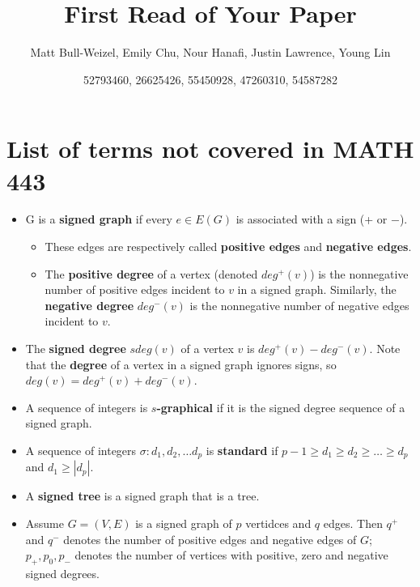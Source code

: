 \documentclass{article}
\title{First Read of Your Paper}
\author{Matt Bull-Weizel, Emily Chu, Nour Hanafi, Justin Lawrence, Young Lin}
\date{52793460, 26625426, 55450928, 47260310, 54587282}
\begin{document}
\maketitle

\section{List of terms not covered in MATH 443}
\begin{itemize}
\item G is a \textbf{signed graph} if every \(e \in E(G)\) is associated with a sign (+ or \(-\)). 
    \begin{itemize} 
        \item These edges are respectively called \textbf{positive edges} and \textbf{negative edges}.
        \item The \textbf{positive degree} of a vertex (denoted \(deg^+(v)\)) is the nonnegative number of positive edges incident to \(v\) in a signed graph. Similarly, the \textbf{negative degree} \(deg^-(v)\) is the nonnegative number of negative edges incident to \(v\).
    \end{itemize}
\item The \textbf{signed degree} \(sdeg(v)\) of a vertex \(v\) is \(deg^+(v) - deg^-(v)\). Note that the \textbf{degree} of a vertex in a signed graph ignores signs, so \(deg(v) = deg^+(v) + deg^-(v)\).
\item A sequence of integers is \textbf{\(s\)-graphical} if it is the signed degree sequence of a signed graph.
\item A sequence of integers \(\sigma: d_1, d_2, \dots d_p\) is \textbf{standard} if  \(p-1 \ge d_1 \ge d_2 \ge \dots \ge d_p\) and \(d_1 \ge |d_p|\).
\item A \textbf{signed tree} is a signed graph that is a tree.
\item Assume \(G = (V, E)\) is a signed graph of \(p\) vertidces and \(q\) edges. Then \(q^+\) and \(q^-\) denotes the number of positive edges and negative edges of \(G\); \(p_+, p_0, p_-\) denotes the number of vertices with positive, zero and negative signed degrees.
\end{itemize}
\end{document}

